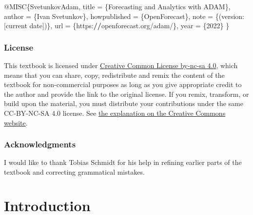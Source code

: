 \documentclass[
]{book}
\newenvironment{Shaded}{\begin{snugshade}}{\end{snugshade}}
\newcommand{\DecValTok}[1]{\textcolor[rgb]{0.00,0.00,0.81}{#1}}
\newcommand{\ErrorTok}[1]{\textcolor[rgb]{0.64,0.00,0.00}{\textbf{#1}}}
\newcommand{\NormalTok}[1]{#1}
\newcommand{\OtherTok}[1]{\textcolor[rgb]{0.56,0.35,0.01}{#1}}
\newcommand{\SpecialCharTok}[1]{\textcolor[rgb]{0.00,0.00,0.00}{#1}}
\theoremstyle{definition}
\theoremstyle{definition}
\theoremstyle{definition}
\theoremstyle{definition}
\theoremstyle{remark}
\begin{document}
\begin{Shaded}
\begin{Highlighting}[]
\SpecialCharTok{@}\NormalTok{MISC\{SvetunkovAdam,}
\NormalTok{    title }\OtherTok{=}\NormalTok{ \{Forecasting and Analytics with ADAM\},}
\NormalTok{    author }\OtherTok{=}\NormalTok{ \{Ivan Svetunkov\},}
\NormalTok{    howpublished }\OtherTok{=}\NormalTok{ \{OpenForecast\},}
\NormalTok{    note }\OtherTok{=}\NormalTok{ \{(version}\SpecialCharTok{:}\NormalTok{ [current date])\},}
\NormalTok{    url }\OtherTok{=}\NormalTok{ \{https}\SpecialCharTok{:}\ErrorTok{//}\NormalTok{openforecast.org}\SpecialCharTok{/}\NormalTok{adam}\SpecialCharTok{/}\NormalTok{\},}
\NormalTok{    year }\OtherTok{=}\NormalTok{ \{}\DecValTok{2022}\NormalTok{\}}
\NormalTok{\}}
\end{Highlighting}
\end{Shaded}

\hypertarget{license}{%
\subsection*{License}\label{license}}

This textbook is licensed under \href{https://creativecommons.org/licenses/by-nc-sa/4.0/}{Creative Common License by-nc-sa 4.0}, which means that you can share, copy, redistribute and remix the content of the textbook for non-commercial purposes as long as you give appropriate credit to the author and provide the link to the original license. If you remix, transform, or build upon the material, you must distribute your contributions under the same CC-BY-NC-SA 4.0 license. See \href{https://creativecommons.org/licenses/by-nc-sa/4.0/}{the explanation on the Creative Commons website}.

\hypertarget{acknowledgments}{%
\subsection*{Acknowledgments}\label{acknowledgments}}

I would like to thank Tobias Schmidt for his help in refining earlier parts of the textbook and correcting grammatical mistakes.

\hypertarget{intro}{%
\chapter{Introduction}\label{intro}}
\end{document}
